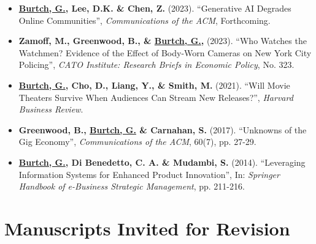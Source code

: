 \documentclass[10.5pt,letterpaper,sans]{moderncv}        %
\begin{document}
\smallskip

\begin{itemize}[leftmargin=!,labelindent=5pt,itemindent=-15pt]

\item \textbf{\underline{Burtch, G.}, Lee, D.K. \& Chen, Z.} (2023). ``Generative AI Degrades Online Communities'', \textit{Communications of the ACM}, Forthcoming.

\item \textbf{Zamoff, M., Greenwood, B., \& \underline{Burtch, G.}, } (2023). ``Who Watches the Watchmen? Evidence of the Effect of Body-Worn Cameras on New York City Policing'', \textit{CATO Institute: Research Briefs in Economic Policy}, No. 323.

\item \textbf{\underline{Burtch, G.}, Cho, D., Liang, Y., \& Smith, M.} (2021). ``Will Movie Theaters Survive When Audiences Can Stream New Releases?'', \textit{Harvard Business Review}.

\item \textbf{Greenwood, B., \underline{Burtch, G.} \& Carnahan, S.} (2017). ``Unknowns of the Gig Economy'', \textit{Communications of the ACM}, 60(7), pp. 27-29.

\item \textbf{\underline{Burtch, G.}, Di Benedetto, C. A. \& Mudambi, S.} (2014). ``Leveraging Information Systems for Enhanced Product Innovation'', In: \textit{Springer Handbook of e-Business Strategic Management}, pp. 211-216.

\end{itemize}

\section{Manuscripts Invited for Revision}
\end{document}
